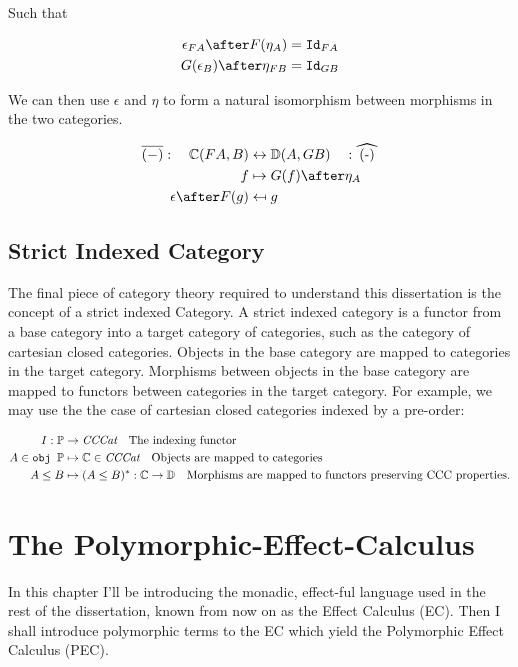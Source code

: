\documentclass{Report}
\begin{document}
Such that 

\begin{align}
    \epsilon_{F A}\after F(\eta_A) & = \Id{F A} \\
    G(\epsilon_B)\after \eta_{F B} & = \Id{G B}
\end{align}

We can then use $\epsilon$ and $\eta$ to form a natural isomorphism between morphisms in the two categories.

\begin{align}
    \bar{(-)}: \quad\C(FA, B) &\leftrightarrow \DC(A, GB) \quad: \widehat{(-)}\\
     f & \mapsto G(f)\after\eta_A \\
     \epsilon\after F(g) & \mapsfrom g\\
\end{align}

\section{Strict Indexed Category}
The final piece of category theory required to understand this dissertation is the concept of a strict indexed Category. A strict indexed category is a functor from a base category into a target category of categories, such as the category of cartesian closed categories. Objects in the base category are mapped to categories in the target category. Morphisms between objects in the base category are mapped to functors between categories in the target category. For example, we may use the the case of cartesian closed categories indexed by a pre-order:

\begin{align}
    I: \mathbb{P} & \rightarrow \textit{CCCat}\quad\text{The indexing functor} \\
    A \in\texttt{obj }\mathbb{P} & \mapsto \mathbb{C} \in\textit{CCCat}\quad\text{Objects are mapped to categories}\\
    A \leq B & \mapsto (A \leq B)^*: \mathbb{C} \rightarrow \mathbb{D}\quad\text{Morphisms are mapped to functors preserving CCC properties.}
\end{align}


\chapter{The Polymorphic-Effect-Calculus}
In this chapter I'll be introducing the monadic, effect-ful language used in the rest of the dissertation, known from now on as the Effect Calculus (EC). Then I shall introduce polymorphic terms to the EC which yield the Polymorphic Effect Calculus (PEC).
\end{document}
